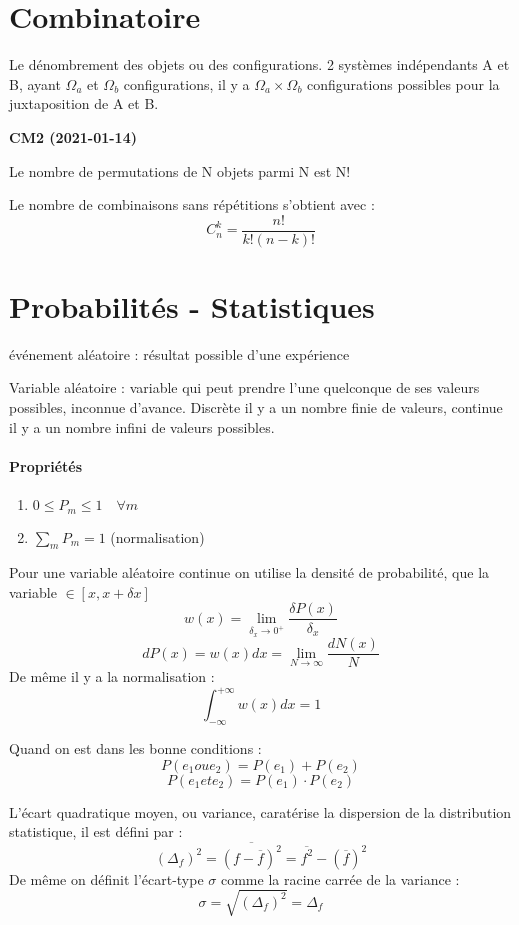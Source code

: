 \documentclass[12pt,a4paper]{report}
\begin{document}
\section{Combinatoire}
Le dénombrement des objets ou des configurations. 2 systèmes indépendants A et B, ayant $\Omega_a$ et $\Omega_b$ configurations, il y a \(\Omega_a \times \Omega_b\) configurations possibles pour la juxtaposition de A et B.

\begin{center}
\textbf{CM2 (2021-01-14)}
\end{center}

Le nombre de permutations de N objets parmi N est N!

Le nombre de combinaisons sans répétitions s'obtient avec :
\[
	C^k_n = \dfrac{n!}{k!(n-k)!}
\]

\section{Probabilités - Statistiques}

événement aléatoire : résultat possible d'une expérience

Variable aléatoire : variable qui peut prendre l'une quelconque de ses valeurs possibles, inconnue d'avance. Discrète il y a un nombre finie de valeurs, continue il y a un nombre infini de valeurs possibles.

\paragraph{Propriétés}
\begin{enumerate}
	\item \(0 \leq P_m \leq 1 \quad \forall m\)
	\item \(\sum_m P_m = 1\) (normalisation)
\end{enumerate}

Pour une variable aléatoire continue on utilise la densité de probabilité, que la variable \(\in [x, x +\delta x]\)
\[
	w(x) = \lim_{\delta_x \rightarrow 0^+} \frac{\delta P(x)}{\delta_x}
\]
\[
	dP(x) = w(x)dx = \lim_{N \rightarrow \infty} \frac{dN(x)}{N}
\]
De même il y a la normalisation :
\[
	\int_{-\infty}^{+\infty} w(x)dx = 1
\]

Quand on est dans les bonne conditions :
\[
	P(e_1 ou e_2) = P(e_1) + P(e_2)
\]
\[
	P(e_1 et e_2) = P(e_1)\cdot P(e_2)
\]

L'écart quadratique moyen, ou variance, caratérise la dispersion de la distribution statistique, il est défini par :
\[
	(\Delta_f)^2 = \overline{(f - \overline{f})^2} = \overline{f^2} - (\overline{f})^2
\]
De même on définit l'écart-type \(\sigma\) comme la racine carrée de la variance :
\[
	\sigma = \sqrt{(\Delta_f)^2} = \Delta_f
\]
\end{document}
